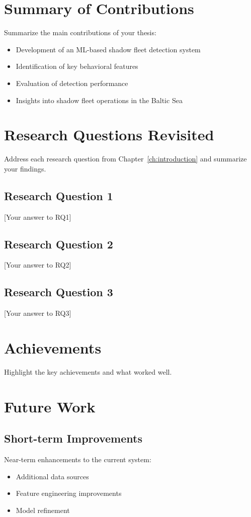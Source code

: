
\section{Summary of Contributions}
Summarize the main contributions of your thesis:
\begin{itemize}
    \item Development of an ML-based shadow fleet detection system
    \item Identification of key behavioral features
    \item Evaluation of detection performance
    \item Insights into shadow fleet operations in the Baltic Sea
\end{itemize}

\section{Research Questions Revisited}
Address each research question from Chapter~\ref{ch:introduction} and summarize your findings.

\subsection{Research Question 1}
[Your answer to RQ1]

\subsection{Research Question 2}
[Your answer to RQ2]

\subsection{Research Question 3}
[Your answer to RQ3]

\section{Achievements}
Highlight the key achievements and what worked well.

\section{Future Work}
\subsection{Short-term Improvements}
Near-term enhancements to the current system:
\begin{itemize}
    \item Additional data sources
    \item Feature engineering improvements
    \item Model refinement
\end{itemize}


